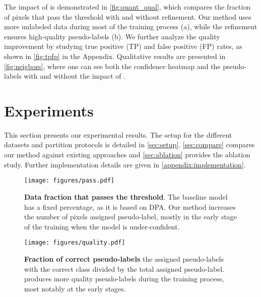 \documentclass{article}
\renewcommand{\cite}[1]{\citep{#1}}
\begin{document}
The impact of \methodname{} is demonstrated in \cref{fig:quant_qual}, which compares the fraction of pixels that pass the threshold with and without refinement. Our method uses more unlabeled data during most of the training process (a), while the refinement ensures high-quality pseudo-labels (b). We further analyze the quality improvement by studying true positive (TP) and false positive (FP) rates, as shown in \cref{fig:tpfp} in the Appendix.  Qualitative results are presented in \cref{fig:neigbors}, where one can see both the confidence heatmap and the pseudo-labels with and without the impact of \methodname{}. \section{Experiments}\label{sec:experiments}

This section presents our experimental results. The setup for the different datasets and partition protocols is detailed in \cref{sec:setup}. \cref{sec:compare} compares our method against existing approaches and \cref{sec:ablation} provides the ablation study. Further implementation details are given in \cref{appendix:implementation}.


\begin{figure*}
    \centering
    \begin{subfigure}{0.49\linewidth}
    \texttt{[image: figures/pass.pdf]} 
        \caption{\textbf{Data fraction that passes the threshold}. The baseline model has a fixed percentage, as it is based on DPA. Our method increases the number of pixels assigned  pseudo-label, mostly in the early stage of the training when the model is under-confident.}
    \end{subfigure}
    \hfill
    \begin{subfigure}{0.49\linewidth}
 	\texttt{[image: figures/quality.pdf]}
        \caption{\textbf{Fraction of correct pseudo-labels} the assigned pseudo-labels with the correct class divided by the total assigned pseudo-label. \methodname{} produces more quality pseudo-labels during the training process, most notably at the early stages.}
    \end{subfigure}
	\caption{Pseudo-label quantity and quality on PASCAL VOC 2012 \cite{voc} with 366 labeled images using our margin (\ref{eqn:kappa_margin}) confidence function.
 }
	\label{fig:quant_qual}
\end{figure*}
\end{document}
